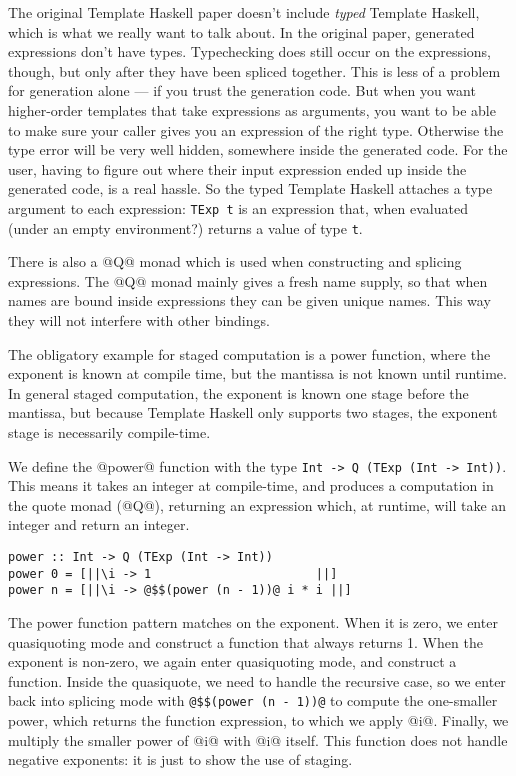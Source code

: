 The original Template Haskell paper \cite{sheard2002template} doesn't include \emph{typed} Template Haskell, which is what we really want to talk about.
In the original paper, generated expressions don't have types.
Typechecking does still occur on the expressions, though, but only after they have been spliced together.
This is less of a problem for generation alone --- if you trust the generation code.
But when you want higher-order templates that take expressions as arguments, you want to be able to make sure your caller gives you an expression of the right type.
Otherwise the type error will be very well hidden, somewhere inside the generated code.
For the user, having to figure out where their input expression ended up inside the generated code, is a real hassle.
So the typed Template Haskell attaches a type argument to each expression: \lstinline|TExp t| is an expression that, when evaluated (under an empty environment?) returns a value of type \lstinline|t|.

There is also a @Q@ monad which is used when constructing and splicing expressions.
The @Q@ monad mainly gives a fresh name supply, so that when names are bound inside expressions they can be given unique names. This way they will not interfere with other bindings.

The obligatory example for staged computation is a power function, where the exponent is known at compile time, but the mantissa is not known until runtime.
In general staged computation, the exponent is known one stage before the mantissa, but because Template Haskell only supports two stages, the exponent stage is necessarily compile-time.

We define the @power@ function with the type \lstinline/Int -> Q (TExp (Int -> Int))/. This means it takes an integer at compile-time, and produces a computation in the quote monad (@Q@), returning an expression which, at runtime, will take an integer and return an integer.

\begin{lstlisting}
power :: Int -> Q (TExp (Int -> Int))
power 0 = [||\i -> 1                       ||]
power n = [||\i -> @$$(power (n - 1))@ i * i ||]
\end{lstlisting}

The power function pattern matches on the exponent.
When it is zero, we enter quasiquoting mode and construct a function that always returns 1.
When the exponent is non-zero, we again enter quasiquoting mode, and construct a function.
Inside the quasiquote, we need to handle the recursive case, so we enter back into splicing mode with \lstinline/@$$(power (n - 1))@/ to compute the one-smaller power, which returns the function expression, to which we apply @i@. Finally, we multiply the smaller power of @i@ with @i@ itself.
This function does not handle negative exponents: it is just to show the use of staging.


